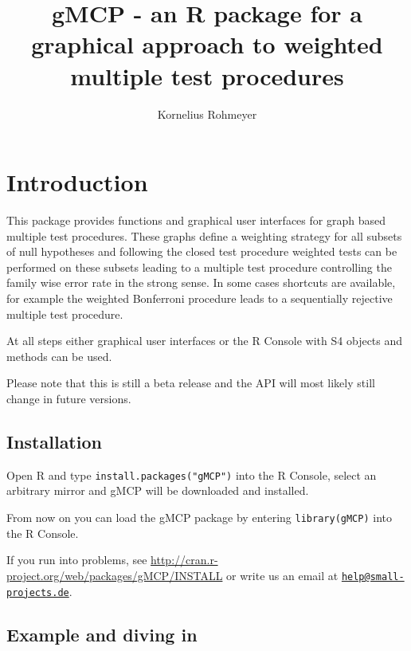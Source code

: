 \documentclass[a4paper, 11pt]{article}
\numberwithin{equation}{section}
\theoremstyle{definition}
\theoremstyle{plain}
\begin{document}

\title{gMCP - an R package for a graphical approach to weighted multiple test procedures} 

\author{Kornelius Rohmeyer}

\maketitle

\tableofcontents


\section{Introduction}

This package provides functions and graphical user interfaces for
graph based multiple test procedures.  These graphs define a weighting
strategy for all subsets of null hypotheses and following the closed
test procedure weighted tests can be performed on these subsets
leading to a multiple test procedure controlling the family wise error
rate in the strong sense. In some cases shortcuts are available, for
example the weighted Bonferroni procedure leads to a sequentially
rejective multiple test procedure.

At all steps either graphical user interfaces or the R Console with S4
objects and methods can be used.

Please note that this is still a beta release and the API will most
likely still change in future versions.

\subsection{Installation}

Open R and type \texttt{install.packages("gMCP")} into the R Console,
select an arbitrary mirror and gMCP will be downloaded and installed.

From now on you can load the gMCP package by entering \texttt{library(gMCP)} into the R Console.

If you run into problems, see \url{http://cran.r-project.org/web/packages/gMCP/INSTALL} or write
us an email at \href{mailto:help@small-projects.de}{\texttt{help@small-projects.de}}.

\subsection{Example and diving in}
\end{document}
